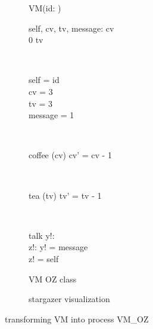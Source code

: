 \begin{figure}[H]
\begin{subfigure}{.6\textwidth}
\centering
\begin{class}{VM(id: \integer)}
\\
\begin{state}
self, cv, tv, message: \integer
{} \leq  cv 
\\
0 \leq  tv 
\end{state} 
\\
\begin{init}
self = id
\\cv = 3
\\tv = 3
\\message = 1
\end{init} 
\\
\begin{op}{coffee}
\Delta (cv)
\ST
cv' = cv - 1
\end{op}
\\
\begin{op}{tea}
\Delta (tv)
\ST
tv' = tv - 1
\end{op}
\\
\begin{op}{talk}
y!: \integer
\\z!: \integer
\ST
y! = message
\\z! = self
\end{op}
\end{class}
  \caption{VM OZ class}
\end{subfigure}%
\begin{subfigure}{.4\textwidth}
  \centering
{}
  \caption{stargazer visualization}
\end{subfigure}
\caption{transforming VM into \picalc{} process VM\_OZ}
\label{tra_vm_OZ}
\end{figure}

